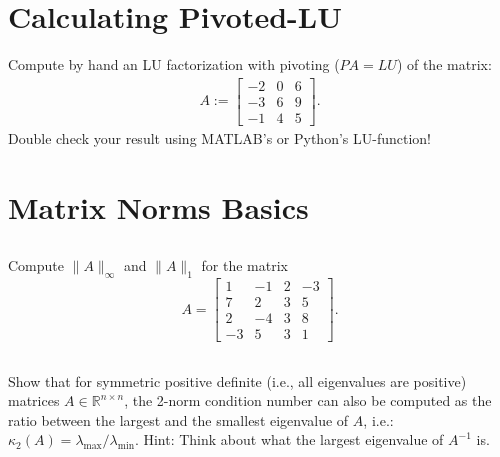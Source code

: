 \documentclass[11pt,letterpaper]{article}
\begin{document}
\section{Calculating Pivoted-LU}
Compute by hand an LU factorization with pivoting ($PA = LU$) of the matrix:
\begin{align*}
A:=
  \begin{bmatrix}
    -2  &   0   &   6\\
    -3  &   6   &   9\\
    -1 &    4   &   5
  \end{bmatrix}.
\end{align*}
Double check your result using MATLAB's or Python's LU-function!

\section{Matrix Norms Basics}
\subsection{}
Compute $\|A\|_\infty$ and $\|A\|_1$ for the matrix
\[
A = \begin{bmatrix}
1 & -1  &2 & -3 \\ 7 & 2 & 3 & 5 \\ 2 & -4 & 3 & 8 \\ -3 & 5 & 3 & 1
\end{bmatrix}.
\]


\subsection{}
Show that for symmetric positive definite (i.e., all eigenvalues
  are positive) matrices $A\in \mathbb R^{n\times n}$, the 2-norm
  condition number can also be computed as the ratio between the
  largest and the smallest eigenvalue of $A$, i.e.:
  $\kappa_2(A)=\lambda_{\max}/\lambda_{\min}$. Hint: Think about what
  the largest eigenvalue of $A^{-1}$ is.
  
\end{document}
